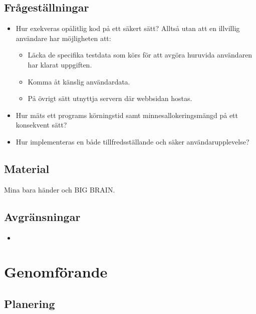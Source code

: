 \documentclass{article}
\begin{document}
\subsection{Frågeställningar}

\begin{itemize}
	\item Hur exekveras opålitlig kod på ett säkert sätt? Alltså utan att en
		illvillig användare har möjligheten att:
		\begin{itemize}
			\item Läcka de specifika testdata som körs för att avgöra huruvida
				användaren har klarat uppgiften.
			\item Komma åt känslig användardata.
			\item På övrigt sätt utnyttja servern där webbsidan hostas.
		\end{itemize}
	\item
		Hur mäts ett programs körningstid samt minnesallokeringsmängd på ett
		konsekvent sätt?
	\item
		Hur implementeras en både tillfredsställande och säker
		användarupplevelse?

\end{itemize}


\subsection{Material}

Mina bara händer och BIG BRAIN.

\subsection{Avgränsningar}

\begin{itemize}
	\item
\end{itemize}

\section{Genomförande}

\subsection{Planering}
\end{document}
